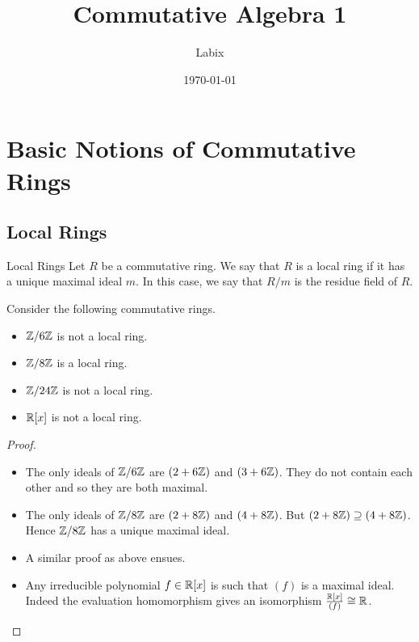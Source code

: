 \documentclass[a4paper]{article}
\title{Commutative Algebra 1}
\author{Labix}
\date{\today}
\begin{document}
\maketitle
\begin{abstract}
\end{abstract}
\pagebreak
\tableofcontents
\pagebreak

\pagebreak
\section{Basic Notions of Commutative Rings}
\subsection{Local Rings}
\begin{defn}{Local Rings}{} Let $R$ be a commutative ring. We say that $R$ is a local ring if it has a unique maximal ideal $m$. In this case, we say that $R/m$ is the residue field of $R$. 
\end{defn}

\begin{eg}{}{} Consider the following commutative rings. 
\begin{itemize}
\item $\mathbb{Z}/6\mathbb{Z}$ is not a local ring. 
\item $\mathbb{Z}/8\mathbb{Z}$ is a local ring. 
\item $\mathbb{Z}/24\mathbb{Z}$ is not a local ring. 
\item $\mathbb{R}[x]$ is not a local ring. 
\end{itemize} \tcbline
\begin{proof}~\\
\begin{itemize}
\item The only ideals of $\mathbb{Z}/6\mathbb{Z}$ are $(2+6\mathbb{Z})$ and $(3+6\mathbb{Z})$. They do not contain each other and so they are both maximal. 
\item The only ideals of $\mathbb{Z}/8\mathbb{Z}$ are $(2+8\mathbb{Z})$ and $(4+8\mathbb{Z})$. But $(2+8\mathbb{Z})\supseteq(4+8\mathbb{Z})$. Hence $\mathbb{Z}/8\mathbb{Z}$ has a unique maximal ideal. 
\item A similar proof as above ensues. 
\item Any irreducible polynomial $f\in\mathbb{R}[x]$ is such that $(f)$ is a maximal ideal. Indeed the evaluation homomorphism gives an isomorphism $\frac{\mathbb{R}[x]}{(f)}\cong\mathbb{R}$. 
\end{itemize}
\end{proof}
\end{eg}
\end{document}

